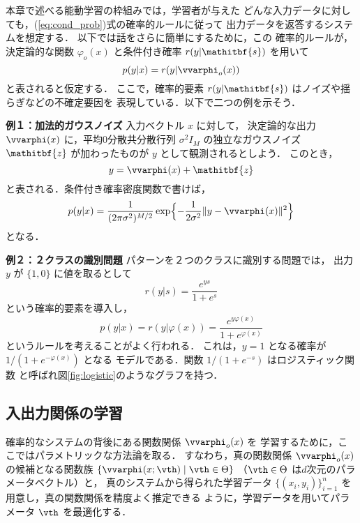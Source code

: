\documentclass[master]{cimt}
\newcommand{\vz}{\mathitbf{z}}
\newcommand{\vs}{\mathitbf{s}}
\begin{document}
本章で述べる能動学習の枠組みでは，学習者が与えた
どんな入力データに対しても，(\ref{eq:cond_prob})式の確率的ルールに従って
出力データを返答するシステムを想定する．
以下では話をさらに簡単にするために，この
確率的ルールが，決定論的な関数 $\varphi_o(x)$ と条件付き確率 $r(y | 
\vs)$ を用いて
\begin{equation*}
	p(y | x) =  r( y | \vvarphi_o(x) )
\end{equation*}
と表されると仮定する．
ここで，確率的要素 $r(y | \vs) $ はノイズや揺らぎなどの不確定要因を
表現している．以下で二つの例を示そう．

\medskip
\noindent
{\bf 例１：加法的ガウスノイズ}\hskip0.5cm
入力ベクトル $x$ に対して，
決定論的な出力 $\vvarphi(x)$ に，平均0分散共分散行列 $\sigma^2 I_M$ 
の独立なガウスノイズ $\vz$ が加わったものが $y$ として観測されるとしよう．
このとき，
\begin{equation*}
	y = \vvarphi(x) + \vz
\end{equation*}
と表される．条件付き確率密度関数で書けば，
\begin{equation*}
	p(y | x ) = \frac{1}{(2\pi \sigma^2)^{M/2}} \exp \Bigl\{ 
	- \frac{1}{2\sigma^2} \| y - \vvarphi(x) \|^2 \Bigr\}
\end{equation*}
となる．
 
\noindent
{\bf 例２：２クラスの識別問題}\hskip0.5cm
パターンを２つのクラスに識別する問題では，
出力 $y$ が $\{ 1, 0 \}$ に値を取るとして
\begin{equation*}
	r( y | s ) = \frac{e^{ys}}{1+e^s}
\end{equation*}
という確率的要素を導入し，
\begin{equation*}
	p(y | x) = r(y| \varphi(x)) = 
	\frac{e^{y \varphi(x) }}{1+e^{\varphi(x)}}
\end{equation*}
というルールを考えることがよく行われる．
これは，$y = 1$ となる確率が $1/(1+ e^{- \varphi(x) })$ となる
モデルである．関数 $1/(1+e^{-s})$ はロジスティック関数
と呼ばれ図\ref{fig:logistic}のようなグラフを持つ．


\subsection{入出力関係の学習}
確率的なシステムの背後にある関数関係 $\vvarphi_o(x)$ を
学習するために，ここではパラメトリックな方法論を取る．
すなわち，真の関数関係 $\vvarphi_o(x)$ の候補となる関数族
$\{ \vvarphi(x; \vth) \mid \vth \in \Theta \}$ （$\vth \in \Theta$ 
は$d$次元のパラメータベクトル）と，
真のシステムから得られた学習データ $\{(x_i, 
y_i)\}_{i=1}^n$ を用意し，真の関数関係を精度よく推定できる
ように，学習データを用いてパラメータ $\vth$ を最適化する．
\end{document}
